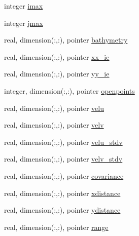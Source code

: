 \begin{DoxyCompactItemize}
\item 
integer \mbox{\hyperlink{structmoduleihradarformat_1_1t__ihradarformat_a06594f7a7c96f73f081ec9b88f07fef3}{imax}}
\item 
integer \mbox{\hyperlink{structmoduleihradarformat_1_1t__ihradarformat_ad9daf49f8ec408a17542805104e9559c}{jmax}}
\item 
real, dimension(\+:,\+:), pointer \mbox{\hyperlink{structmoduleihradarformat_1_1t__ihradarformat_a5f5419a5121e82f2a0780d8b31067387}{bathymetry}}
\item 
real, dimension(\+:,\+:), pointer \mbox{\hyperlink{structmoduleihradarformat_1_1t__ihradarformat_a80e5e826a0aa6b8d2c705f102aa48fd2}{xx\+\_\+ie}}
\item 
real, dimension(\+:,\+:), pointer \mbox{\hyperlink{structmoduleihradarformat_1_1t__ihradarformat_aba0d599820ce9086070fe76c90d704a2}{yy\+\_\+ie}}
\item 
integer, dimension(\+:,\+:), pointer \mbox{\hyperlink{structmoduleihradarformat_1_1t__ihradarformat_a5284872ed4ed702c946f46f8a279a5bb}{openpoints}}
\item 
real, dimension(\+:,\+:), pointer \mbox{\hyperlink{structmoduleihradarformat_1_1t__ihradarformat_a114b7f3570e651aa27f85c2c13fc3feb}{velu}}
\item 
real, dimension(\+:,\+:), pointer \mbox{\hyperlink{structmoduleihradarformat_1_1t__ihradarformat_a666684cdb18b97430bfa87e723d828c4}{velv}}
\item 
real, dimension(\+:,\+:), pointer \mbox{\hyperlink{structmoduleihradarformat_1_1t__ihradarformat_addbeded7b07e04adce5597072b583028}{velu\+\_\+stdv}}
\item 
real, dimension(\+:,\+:), pointer \mbox{\hyperlink{structmoduleihradarformat_1_1t__ihradarformat_aff6187f5da48f367eb73e03d0466a411}{velv\+\_\+stdv}}
\item 
real, dimension(\+:,\+:), pointer \mbox{\hyperlink{structmoduleihradarformat_1_1t__ihradarformat_a0e1d7c543ff6a4a5eeb07ad123de93e8}{covariance}}
\item 
real, dimension(\+:,\+:), pointer \mbox{\hyperlink{structmoduleihradarformat_1_1t__ihradarformat_a451c8f05c7a12722e3e546f6a1d22c76}{xdistance}}
\item 
real, dimension(\+:,\+:), pointer \mbox{\hyperlink{structmoduleihradarformat_1_1t__ihradarformat_a490a00b526f0c0227c566fad71ae0ef3}{ydistance}}
\item 
real, dimension(\+:,\+:), pointer \mbox{\hyperlink{structmoduleihradarformat_1_1t__ihradarformat_ae99380a15b0c3045dc9a386940a32bf5}{range}}

\end{DoxyCompactItemize}
